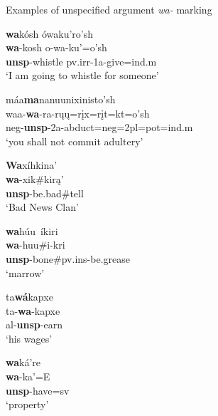 \begin{exe}

\item\label{UNSPwithWA} Examples of unspecified argument \textit{wa-} marking

	\begin{xlist}

	\item \glll \textbf{wa}kósh ówaku'ro'sh\\
	\textbf{wa}-kosh o-wa-ku'=o'sh\\
	\textbf{unsp}-\textnormal{whistle} pv.irr-1a-\textnormal{give}=ind.m\\
	\glt `I am going to whistle for someone' \citep[487]{hollow1970}
	
	\item \glll máa\textbf{ma}nanuunixinisto'sh\\
	waa-\textbf{wa}-ra-rųų=rįx=rįt=kt=o'sh\\
	neg-\textbf{unsp}-2a-\textnormal{abduct}=neg=2pl=pot=ind.m\\
	\glt `you shall not commit adultery' \citep[22]{hollow1970}
	
	\item \glll \textbf{Wa}xíhkina'\\
	\textbf{wa}-xik\#kirą'\\
	\textbf{unsp}-\textnormal{be.bad}\#\textnormal{tell}\\
	\glt `Bad News Clan' \citep[30]{bowers1950}
		
	\item \glll \textbf{wa}húu~íkiri\\
	\textbf{wa}-huu\#i-kri\\
	\textbf{unsp}-\textnormal{bone}\#pv.ins-\textnormal{be.grease}\\
	\glt `marrow' \citep[82]{hollow1970}

	\item \glll ta\textbf{wá}kapxe\\
	ta-\textbf{wa}-kapxe\\
	al-\textbf{unsp}-\textnormal{earn}\\
	\glt `his wages' \citep[101]{hollow1970}
	
	\item \glll \textbf{wa}ká're\\
	\textbf{wa}-ka'=E\\
	\textbf{unsp}-\textnormal{have}=sv\\
	\glt 	`property' \citep[102]{hollow1970}
		

\end{xlist}
\end{exe}
